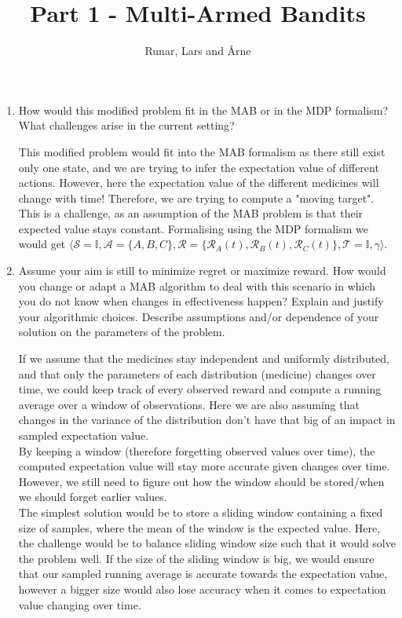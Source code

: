 \documentclass{article}
\title{\vspace{-5.0cm}Part 1 - Multi-Armed Bandits\vspace{-0.3cm}}
\author{Runar, Lars and Årne\vspace{-0.5cm}}
\date{}
\begin{document}
\maketitle
\vspace{-1.0cm}

\begin{enumerate}

\item{How would this modified problem fit in the MAB or in the MDP formalism? What challenges arise in the current setting?}

This modified problem would fit into the MAB formalism as there still exist only one state, and we are trying to infer the expectation value of different actions. However, here the expectation value of the different medicines will change with time! Therefore, we are trying to compute a "moving target". This is a challenge, as an assumption of the MAB problem is that their expected value stays constant. Formalising using the MDP formalism we would get $\langle \mathcal{S} = \mathbb{I}, \mathcal{A} = \{A, B, C\}, \mathcal{R} = \{\mathcal{R}_A(t), \mathcal{R}_B(t), \mathcal{R}_C(t) \}, \mathcal{T} = \mathbb{I}, \gamma  \rangle$.

\item{Assume your aim is still to minimize regret or maximize reward. How would you change or adapt a MAB algorithm to deal with this scenario in which you do not know when changes in effectiveness happen? Explain and justify your algorithmic choices. Describe assumptions and/or dependence of your solution on the parameters of the problem.}

If we assume that the medicines stay independent and uniformly distributed, and that only the parameters of each distribution (medicine) changes over time, we could keep track of every observed reward and compute a running average over a window of observations. Here we are also assuming that changes in the variance of the distribution don't have that big of an impact in sampled expectation value.
\\[5pt]
By keeping a window (therefore forgetting observed values over time), the computed expectation value will stay more accurate given changes over time.  However, we still need to figure out how the window should be stored/when we should forget earlier values.
\\[5pt]
The simplest solution would be to store a sliding window containing a fixed size of samples, where the mean of the window is the expected value. Here, the challenge would be to balance sliding window size such that it would solve the problem well. If the size of the sliding window is big, we would ensure that our sampled running average is accurate towards the expectation value, however a bigger size would also lose accuracy when it comes to expectation value changing over time.


\end{enumerate}
\end{document}

